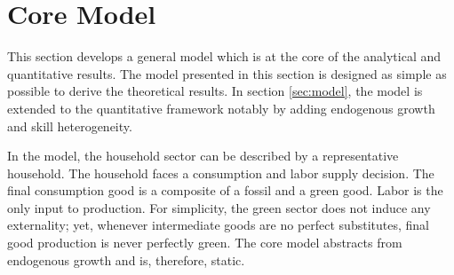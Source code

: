 \section{Core Model}\label{sec:mod_an}

This section develops a general model which is at the core of the analytical and quantitative results. 
The model presented in this section is designed as simple as possible to derive the theoretical results. In section \ref{sec:model}, the model is extended to the quantitative framework notably by adding endogenous growth and skill heterogeneity. %

In the model, the household sector can be described by a representative household. The household faces a consumption and labor supply decision. The final consumption good is a composite of a fossil and a green good. Labor is the only input to production. For simplicity, the green sector does not induce any externality; yet, whenever intermediate goods are no perfect substitutes, final good production is never perfectly green. The core model abstracts from endogenous growth and is, therefore, static. 

